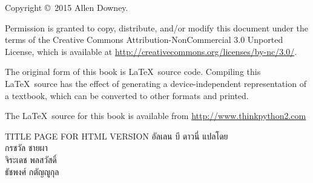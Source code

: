 \begin{latexonly}
\begin{flushright}
\vspace{0.5in}



\vfill

\end{flushright}


\pagebreak
\thispagestyle{empty}

{\small
Copyright \copyright ~2015 Allen Downey.


\vspace{0.2in}


Permission is granted to copy, distribute, and/or modify this document
under the terms of the Creative Commons Attribution-NonCommercial 3.0 Unported
License, which is available at \url{http://creativecommons.org/licenses/by-nc/3.0/}.

The original form of this book is \LaTeX\ source code.  Compiling this
\LaTeX\ source has the effect of generating a device-independent
representation of a textbook, which can be converted to other formats
and printed.

The \LaTeX\ source for this book is available from
\url{http://www.thinkpython2.com}

\vspace{0.2in}

} %

\end{latexonly}


\begin{htmlonly}
TITLE PAGE FOR HTML VERSION
{\Large \thetitle}
{\large อัลเลน บี ดาวนี่}
แปลโดย
\\
กรชวัล ชายผา
\\
จิระเดช พลสวัสดิ์
\\
ธัชพงศ์ กตัญญูกุล


\thedate

\setcounter{chapter}{-1}

\end{htmlonly}

